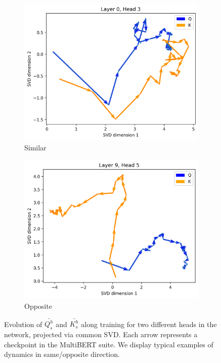 \begin{figure}[ht]
    \centering
    \begin{subfigure}[b]{0.43\columnwidth}
         \includegraphics[width=\linewidth]{sources/part_1/anisotropy/imgs/l0h3_samedir_QK.png}
         \caption{Similar}
         \label{fig:QK_simdir}
    \end{subfigure}
    \hfill
    \begin{subfigure}[b]{0.43\columnwidth}
         \includegraphics[width=\linewidth]{sources/part_1/anisotropy/imgs/l9h5_diffdir_QK.png}
         \caption{Opposite}
         \label{fig:QK_diffdir}
    \end{subfigure}
    \caption{Evolution of $\bar{Q^h_s}$ and $\bar{K^h_s}$ along training for two different heads in the network, projected via common SVD. Each arrow represents a checkpoint in the MultiBERT suite. We display typical examples of dynamics in same/opposite direction.}
    \label{fig:QK_dir}
\end{figure}

